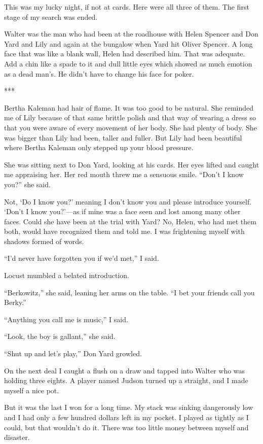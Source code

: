 \documentclass{novel}
\begin{document}
This was my lucky night, if not at cards. Here were all three of them. The first stage of my search was ended.

Walter was the man who had been at the roadhouse with Helen Spencer and Don Yard and Lily and again at the bungalow when Yard hit Oliver Spencer. A long face that was like a blank wall, Helen had described him. That was adequate. Add a chin like a spade to it and dull little eyes which showed as much emotion as a dead man’s. He didn’t have to change his face for poker.

***

Bertha Kaleman had hair of flame. It was too good to be natural. She reminded me of Lily because of that same brittle polish and that way of wearing a dress so that you were aware of every movement of her body. She had plenty of body. She was bigger than Lily had been, taller and fuller. But Lily had been beautiful where Bertha Kaleman only stepped up your blood pressure.

She was sitting next to Don Yard, looking at his cards. Her eyes lifted and caught me appraising her. Her red mouth threw me a sensuous smile. “Don’t I know you?” she said.

Not, ‘Do I know you?’ meaning I don’t know you and please introduce yourself. ‘Don’t I know you?’—as if mine was a face seen and lost among many other faces. Could she have been at the trial with Yard? No, Helen, who had met them both, would have recognized them and told me. I was frightening myself with shadows formed of words.

“I’d never have forgotten you if we’d met,” I said.

Locust mumbled a belated introduction.

“Berkowitz,” she said, leaning her arms on the table. “I bet your friends call you Berky.”

“Anything you call me is music,” I said.

“Look, the boy is gallant,” she said.

“Shut up and let’s play,” Don Yard growled.

On the next deal I caught a flush on a draw and tapped into Walter who was holding three eights. A player named Judson turned up a straight, and I made myself a nice pot.

But it was the last I won for a long time. My stack was sinking dangerously low and I had only a few hundred dollars left in my pocket. I played as tightly as I could, but that wouldn’t do it. There was too little money between myself and disaster.
\end{document}
